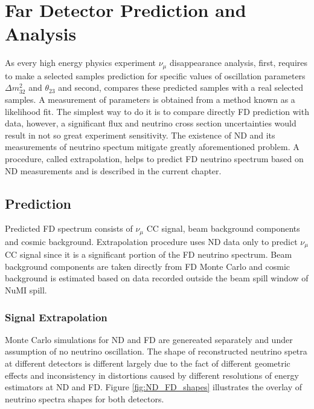 \chapter{Far Detector Prediction and Analysis}
\label{prediction_chapter}

As every high energy physics experiment $\nu_\mu$ disappearance analysis, first, requires to make
a selected samples prediction for specific values of oscillation parameters $\Delta m^2_{32}$ and 
$\theta_{23}$ and second, compares these predicted samples with a real selected samples. A measurement 
of parameters is obtained from a method known as a likelihood fit. The simplest way to do it is to 
compare directly FD prediction with data, however, a significant flux and neutrino cross section
uncertainties would result in not so great experiment sensitivity. The existence of ND and its measurements
of neutrino spectum mitigate greatly aforementioned problem. A procedure, called extrapolation, 
helps to predict FD neutrino spectrum based on ND measurements and is described in the current chapter.

\section{Prediction}
Predicted FD spectrum consists of $\nu_\mu$ CC signal, beam background components and cosmic background.
Extrapolation procedure uses ND data only to predict $\nu_\mu$ CC signal since it is a significant
portion of the FD neutrino spectrum. Beam background components are taken directly from FD Monte Carlo
and cosmic background is estimated based on data recorded outside the beam spill window of NuMI spill. 

\subsection{Signal Extrapolation} \label{extrap_procedure}
Monte Carlo simulations for ND and FD are genereated separately and under assumption of no neutrino
oscillation. The shape of reconstructed neutrino spetra at different detectors is different largely due 
to the fact of different geometric effects and inconsistency in distortions caused by different 
resolutions of energy estimators at ND and FD. Figure \ref{fig:ND_FD_shapes} illustrates the overlay
of neutrino spectra shapes for both detectors.

